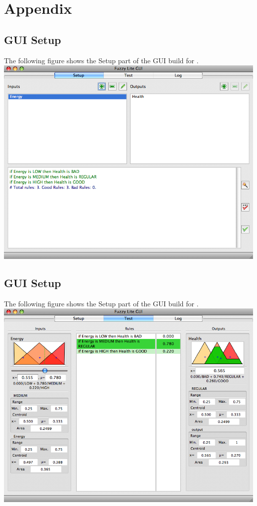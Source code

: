 \chapter*{Appendix}
\section*{GUI Setup}
	The following figure shows the Setup part of the GUI build for \fl.\\
	\vfill
\noindent\includegraphics[scale=0.6]{./figures/gui-setup.png}
	\vfill

\clearpage
\section*{GUI Setup}
	The following figure shows the Setup part of the GUI build for \fl.\\
	\vfill
\noindent\includegraphics[scale=0.6]{./figures/gui-test.png}
	\vfill

